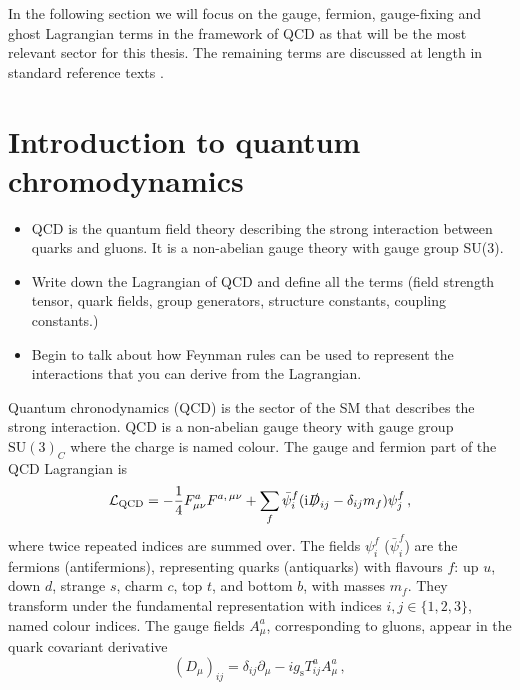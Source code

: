 \documentclass[main.tex]{subfiles}
\begin{document}
    In the following section we will focus on the gauge, fermion, gauge-fixing
    and ghost Lagrangian terms in the framework of QCD as that will be the
    most relevant sector for this thesis. The remaining terms are discussed at
    length in standard reference texts \cite{Peskin:1995ev,Schwartz:2014sze,Romao:2012pq}.


\section{Introduction to quantum chromodynamics}
\begin{itemize}
    \item QCD is the quantum field theory describing the strong
    interaction between quarks and gluons. It is a non-abelian
    gauge theory with gauge group SU(3).
    \item Write down the Lagrangian of QCD and define all the
    terms (field strength tensor, quark fields, group generators,
    structure constants, coupling constants.)
    \item Begin to talk about how Feynman rules can be used
    to represent the interactions that you can derive from
    the Lagrangian.
\end{itemize}
    Quantum chronodynamics (QCD) is the sector of the SM that
    describes the strong interaction. 
    QCD is a non-abelian gauge theory with gauge group
    $\mathrm{SU}(3)_{C}$ where the charge is named colour.
    The gauge and fermion part of the QCD Lagrangian is
    \begin{equation}\label{eqn:L_QCD}
        \mathcal{L}_{\mathrm{QCD}} = -\dfrac{1}{4}F^{a}_{\mu\nu}F^{a, \, \mu\nu}
        + \sum_{f} \bar{\psi}_{i}^{f}(\mathrm{i}\slashed{D}_{ij} - \delta_{ij}m_{f})\psi_{j}^{f} \, ,
    \end{equation}
    where twice repeated indices are summed over.
    The fields $\psi_{i}^{f}$ ($\bar{\psi}_{i}^{f}$) are the fermions (antifermions),
    representing quarks (antiquarks) with flavours $f$: 
    up $u$, down $d$, strange $s$, charm $c$, top $t$, and bottom $b$,
    with masses $m_{f}$. They transform under the fundamental
    representation with indices $i, j \in \{1, 2, 3\}$, named colour indices.
    The gauge fields $A^{a}_{\mu}$, corresponding to gluons, 
    appear in the quark covariant derivative
    \begin{equation}\label{eqn:covariant_deriv}
        (D_{\mu})_{ij} = \delta_{ij}\partial_{\mu} - ig_{\mathrm{s}}T^{a}_{ij}A^{a}_{\mu} \, ,
    \end{equation}
\end{document}
